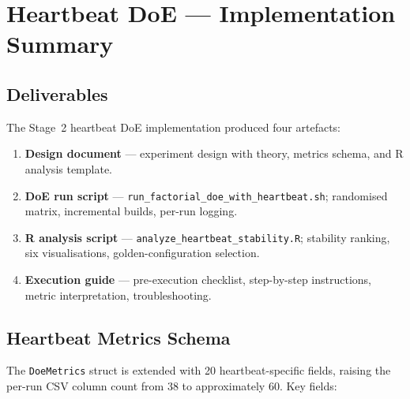 
\section{Heartbeat DoE — Implementation Summary}
\label{sec:heartbeat-doe-implementation}

\subsection{Deliverables}

The Stage~2 heartbeat DoE implementation produced four artefacts:

\begin{enumerate}
  \item \textbf{Design document} — experiment design with theory, metrics
        schema, and R analysis template.
  \item \textbf{DoE run script} — \texttt{run\_factorial\_doe\_with\_heartbeat.sh};
        randomised matrix, incremental builds, per-run logging.
  \item \textbf{R analysis script} — \texttt{analyze\_heartbeat\_stability.R};
        stability ranking, six visualisations, golden-configuration selection.
  \item \textbf{Execution guide} — pre-execution checklist, step-by-step
        instructions, metric interpretation, troubleshooting.
\end{enumerate}

\subsection{Heartbeat Metrics Schema}

The \texttt{DoeMetrics} struct is extended with 20 heartbeat-specific fields,
raising the per-run CSV column count from 38 to approximately 60.
Key fields:

